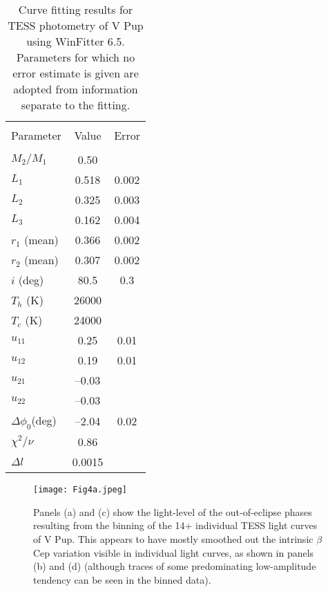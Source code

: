 \documentclass[useAMS,usenatbib]{mnras}                                                                           \usepackage[pdftex]{graphicx}
\begin{document}
\begin{table}
\begin{center}
\caption{Curve fitting results for TESS
photometry of V Pup using {\sc WinFitter 6.5}.
Parameters for which no error estimate is given are adopted from
information separate to the fitting.}
\begin{tabular}{lcc}
   \hline  \\
\multicolumn{1}{c}{Parameter}  & \multicolumn{1}{c}{Value} & 
\multicolumn{1}{c}{Error}\\
\hline \\
$M_2/M_1$ & 0.50 & \\
$L_1$ & 0.518 & 0.002 \\
$L_2$ & 0.325 & 0.003 \\
$L_3$ & 0.162 &  0.004 \\
$r_1$ (mean) & 0.366 & 0.002\\
$r_2$ (mean) & 0.307 & 0.002 \\
$i$ (deg) & 80.5 & 0.3 \\
$T_h$ (K) & 26000 & \\
$T_c$ (K) & 24000 & \\
$u_{11}$ & 0.25 & 0.01\\
$u_{12}$ & 0.19 & 0.01\\
$u_{21}$ & --0.03 &\\
$u_{22}$ & --0.03 &\\
$\Delta\phi_0$(deg) &--2.04 & 0.02 \\
$\chi^2/\nu$ & 0.86 & \\
$\Delta l $& 0.0015  &\\
\hline
\end{tabular}
\end{center}
\end{table}

 
\begin{figure}
\label{fig-4}
\texttt{[image: Fig4a.jpeg]}
\caption{Panels (a) and (c) show the light-level of the out-of-eclipse phases
resulting from the binning of the 14+ individual TESS light curves of V Pup.
This appears to have mostly smoothed out the intrinsic $\beta$ Cep variation 
visible in individual light curves, as shown in panels (b) and (d)
(although traces of some predominating low-amplitude tendency can be seen in the binned data).
}
\end{figure}
 
\end{document}
